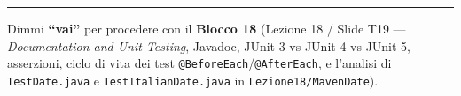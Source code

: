 \documentclass[11pt,a4paper]{article}
\newcommand{\passthrough}[1]{#1}
\begin{document}
\begin{center}\rule{0.5\linewidth}{0.5pt}\end{center}

Dimmi \textbf{``vai''} per procedere con il \textbf{Blocco 18} (Lezione
18 / Slide T19 --- \emph{Documentation and Unit Testing}, Javadoc, JUnit
3 vs JUnit 4 vs JUnit 5, asserzioni, ciclo di vita dei test
\passthrough{\lstinline!@BeforeEach!}/\passthrough{\lstinline!@AfterEach!},
e l'analisi di \passthrough{\lstinline!TestDate.java!} e
\passthrough{\lstinline!TestItalianDate.java!} in
\passthrough{\lstinline!Lezione18/MavenDate!}).
\end{document}
